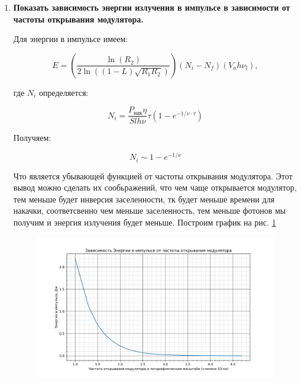 \documentclass[a4paper]{article}
\begin{document}
\begin{enumerate}
	\item \textbf{Показать зависимость энергии излучения в импульсе в зависимости от частоты открывания модулятора.} \par 

	Для энергии в импульсе имеем:

	\begin{equation}
		E = \left( \frac{\ln{(R_2)}}{2\ln{((1-L)\sqrt{R_1R_2})}} \right) (N_i - N_f) (V_ah\nu_l),
		\label{energy}
	\end{equation}

	где $N_i$ определяется:

	\begin{equation}
		N_i = \frac{P_{нак} \eta}{Slh\nu} \tau \left ( 1 - e^{-1/\nu \cdot \tau} \right)
	\end{equation}

	Получяем: 

	\begin{equation}
		N_i \sim 1 - e^{-1/ \nu}
	\end{equation}

	Что является убывающей функцией от частоты открывания модулятора. Этот вывод можно сделать их сообьражений, что чем чаще открывается модулятор, тем меньше будет инверсия 
	заселенности, тк будет меньше времени для накачки, соответсвенно чем меньше заселенность, тем меньше фотонов мы получим и энергия излучения будет меньше. Построим график на рис. \ref{E_p(nu)}

	\begin{figure}[H]
		\begin{center}
			\includegraphics[scale = 0.5]{E_p(nu).png}
			\caption{}
			\label{E_p(nu)}
		\end{center}
	\end{figure}


\end{enumerate}
\end{document}
